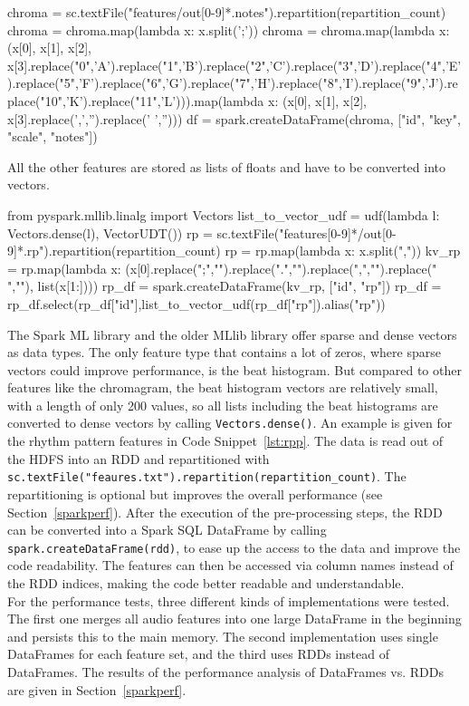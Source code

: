 \begin{pythonCode}[frame=single,label={lst:prep1},caption={Notes preprocessing},captionpos=b]
chroma = sc.textFile("features/out[0-9]*.notes").repartition(repartition_count)
chroma = chroma.map(lambda x: x.split(';'))
chroma = chroma.map(lambda x: (x[0], x[1], x[2], x[3].replace("0",'A').replace("1",'B').replace("2",'C').replace("3",'D').replace("4",'E').replace("5",'F').replace("6",'G').replace("7",'H').replace("8",'I').replace("9",'J').replace("10",'K').replace("11",'L'))).map(lambda x: (x[0], x[1], x[2], x[3].replace(',','').replace(' ','')))
df = spark.createDataFrame(chroma, ["id", "key", "scale", "notes"])
\end{pythonCode}

\noindent All the other features are stored as lists of floats and have to be converted into vectors. 

\begin{pythonCode}[frame=single,label={lst:rpp},caption={Rhythm patterns preprocessing},captionpos=b]
from pyspark.mllib.linalg import Vectors
list_to_vector_udf = udf(lambda l: Vectors.dense(l), VectorUDT())
rp = sc.textFile("features[0-9]*/out[0-9]*.rp").repartition(repartition_count)
rp = rp.map(lambda x: x.split(","))
kv_rp = rp.map(lambda x: (x[0].replace(";","").replace(".","").replace(",","").replace(" ",""), list(x[1:])))
rp_df = spark.createDataFrame(kv_rp, ["id", "rp"])
rp_df = rp_df.select(rp_df["id"],list_to_vector_udf(rp_df["rp"]).alias("rp"))
\end{pythonCode}

\noindent The Spark ML library and the older MLlib library offer sparse and dense vectors as data types. The only feature type that contains a lot of zeros, where sparse vectors could improve performance, is the beat histogram. But compared to other features like the chromagram, the beat histogram vectors are relatively small, with a length of only 200 values, so all lists including the beat histograms are converted to dense vectors by calling \lstinline{Vectors.dense()}. 
\noindent An example is given for the rhythm pattern features in Code Snippet~\ref{lst:rpp}. The data is read out of the HDFS into an RDD and repartitioned with \lstinline{sc.textFile("feaures.txt").repartition(repartition_count)}. The repartitioning is optional but improves the overall performance (see Section~\ref{sparkperf}). After the execution of the pre-processing steps, the RDD can be converted into a Spark SQL DataFrame by calling \lstinline{spark.createDataFrame(rdd)}, to ease up the access to the data and improve the code readability. The features can then be accessed via column names instead of the RDD indices, making the code better readable and understandable.\\
For the performance tests, three different kinds of implementations were tested. The first one merges all audio features into one large DataFrame in the beginning and persists this to the main memory. The second implementation uses single DataFrames for each feature set, and the third uses RDDs instead of DataFrames. The results of the performance analysis of DataFrames vs. RDDs are given in Section~\ref{sparkperf}.

